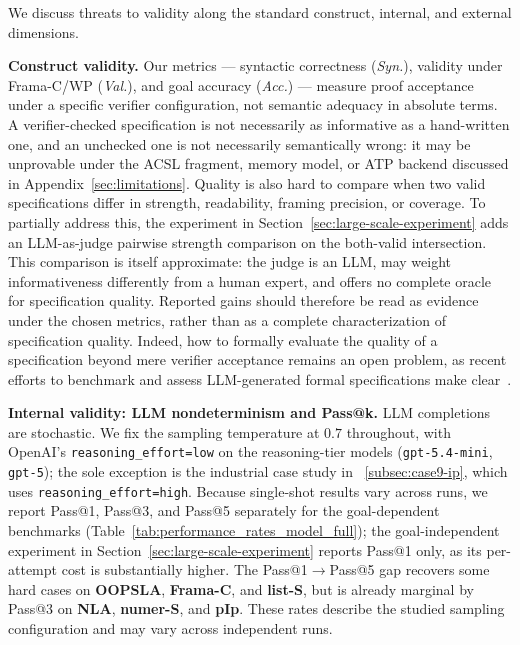 We discuss threats to validity along the standard construct, internal, and
external dimensions.

\smallskip
\noindent\textbf{Construct validity.}
Our metrics --- syntactic correctness (\emph{Syn.}), validity under Frama-C/WP
(\emph{Val.}), and goal accuracy (\emph{Acc.}) --- measure proof acceptance
under a specific verifier configuration, not semantic adequacy in absolute
terms. A verifier-checked specification is not necessarily as informative as a
hand-written one, and an unchecked one is not necessarily semantically wrong: it
may be unprovable under the ACSL fragment, memory model, or ATP backend
discussed in Appendix~\ref{sec:limitations}. Quality is also hard to compare when
two valid specifications differ in strength, readability, framing precision, or
coverage. To partially address this, the experiment in
Section~\ref{sec:large-scale-experiment} adds an LLM-as-judge pairwise strength
comparison on the both-valid intersection. This comparison is itself
approximate: the judge is an LLM, may weight informativeness differently from a
human expert, and offers no complete oracle for specification quality. Reported
gains should therefore be read as evidence under the chosen metrics, rather than
as a complete characterization of specification quality. Indeed, how to
formally evaluate the quality of a specification beyond mere verifier
acceptance remains an open problem, as recent efforts to benchmark and assess
LLM-generated formal specifications make
clear~\cite{yang2026how,thakur2025clever}.

\smallskip
\noindent\textbf{Internal validity: LLM nondeterminism and Pass@k.}
LLM completions are stochastic. We fix the sampling temperature at $0.7$
throughout, with OpenAI's \texttt{reasoning\_effort=low} on the reasoning-tier
models (\texttt{gpt-5.4-mini}, \texttt{gpt-5}); the sole exception is the
industrial case study in ~\ref{subsec:case9-ip}, which uses
\texttt{reasoning\_effort=high}.
Because single-shot results vary across runs, we report Pass@1,
Pass@3, and Pass@5 separately for the goal-dependent benchmarks
(Table~\ref{tab:performance_rates_model_full}); the goal-independent
experiment in Section~\ref{sec:large-scale-experiment} reports Pass@1 only, as its
per-attempt cost is substantially higher. The Pass@1$\to$Pass@5 gap recovers
some hard cases on \textbf{OOPSLA}, \textbf{Frama-C}, and \textbf{list-S}, but is
already marginal by Pass@3 on \textbf{NLA}, \textbf{numer-S}, and \textbf{pIp}.
These rates describe the studied sampling configuration and may vary across independent runs.

